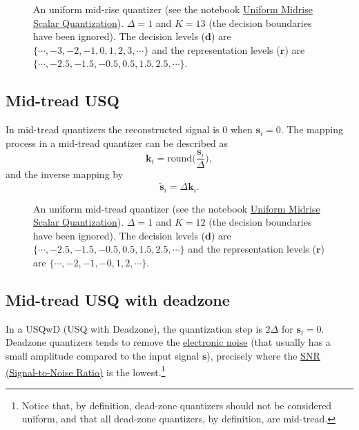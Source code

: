 \begin{figure}
  \caption{An uniform mid-rise quantizer (see the notebook
    \href{https://github.com/vicente-gonzalez-ruiz/scalar_quantization/blob/master/docs/graphics/midrise.ipynb}{Uniform
      Midrise Scalar Quantization}). $\Delta=1$ and $K=13$ (the
    decision boundaries have been ignored). The decision levels
    (${\mathbf d}$) are $\{\cdots,-3,-2,-1,0,1,2,3,\cdots\}$ and the
    representation levels (${\mathbf r}$) are
    $\{\cdots,-2.5,-1.5,-0.5,0.5,1.5,2.5,\cdots\}$.}
  \label{fig:midrise}
\end{figure}

\subsection{Mid-tread USQ}

In mid-tread quantizers the reconstructed signal is $0$ when ${\mathbf
  s}_i=0$. The mapping process in a mid-tread quantizer can be described as
\begin{equation}
  {\mathbf k}_i = \mathrm{round}\Big( \frac{{\mathbf s}_i}{\Delta} \Big),
  \label{eq:midrise}
\end{equation}
and the inverse mapping by
\begin{equation}
  \tilde{\mathbf s}_i = \Delta{\mathbf k}_i.
  \label{eq:inverse_midrise}
\end{equation}

\begin{figure}
  \caption{An uniform mid-tread quantizer (see the notebook
    \href{https://github.com/vicente-gonzalez-ruiz/scalar_quantization/blob/master/docs/graphics/midtread.ipynb}{Uniform
      Midrise Scalar Quantization}). $\Delta=1$ and $K=12$ (the
    decision boundaries have been ignored). The decision levels
    (${\mathbf d}$) are $\{\cdots,-2.5,-1.5,-0.5,0.5,1.5,2.5,\cdots\}$
    and the representation levels (${\mathbf r}$) are
    $\{\cdots,-2,-1,-0,1,2,\cdots\}$.}
  \label{fig:midtread}
\end{figure}

\subsection{Mid-tread USQ with deadzone}

In a USQwD (USQ with Deadzone), the quantization step is $2\Delta$ for
${\mathbf s}_i=0$. Deadzone quantizers tends to remove the
\href{https://en.wikipedia.org/wiki/Noise_(electronics)}{electronic
  noise} (that usually has a small amplitude compared to the input
signal ${\mathbf s}$), precisely where the
\href{https://en.wikipedia.org/wiki/Signal-to-noise_ratio}{SNR
  (Signal-to-Noise Ratio)} is the lowest.\footnote{Notice that, by
  definition, dead-zone quantizers should not be considered uniform,
  and that all dead-zone quantizers, by definition, are mid-tread.}

